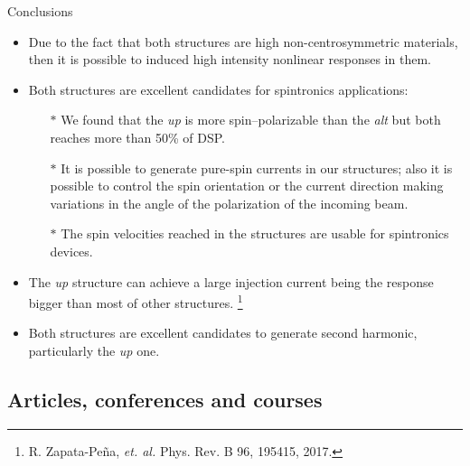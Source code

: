\documentclass{beamer}
\begin{document}
\begin{frame}


{\Large Conclusions}
{\small

\begin{itemize}

\item 
Due to the fact that both structures are high non-centrosymmetric materials,
then it is possible to induced high intensity nonlinear responses in them.

\item 
Both structures are excellent candidates for spintronics applications:

\begin{itemize}
\item[$\boldsymbol{\ast}$] 
We found that the \emph{up} is more spin--polarizable than the \emph{alt} but
both reaches more than 50\% of DSP.

\item[$\boldsymbol{\ast}$] 
It is possible to generate pure-spin currents in our structures; also it is
possible to control the spin orientation or the current direction making
variations in the angle of the polarization of the incoming beam.

\item[$\boldsymbol{\ast}$] 
The spin velocities reached in the structures are usable for spintronics
devices.

\end{itemize}

\item 
The \emph{up} structure can achieve a large injection current being the
response bigger than most of other structures. \footnote[frame]{\tiny R.
Zapata-Pe\~na, \emph{et. al.} Phys. Rev. B 96, 195415, 2017.}

\item 
Both structures are excellent candidates to generate second harmonic,
particularly the \emph{up} one.


\end{itemize}
}

\end{frame}



\subsection{Articles, conferences and courses}
\end{document}
